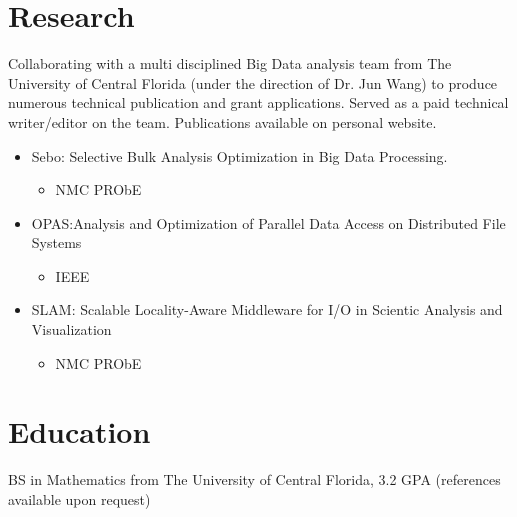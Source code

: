 \documentclass[font = 23,a4paper,sans]{moderncv}
\begin{document}
\section {Research} 
        Collaborating with a multi disciplined Big Data analysis team from The University of Central Florida (under the direction of Dr. Jun Wang) to produce 
            numerous technical publication and grant applications. Served as a paid technical writer/editor on the team. Publications available on personal website.
            \begin{itemize}
                \item Sebo: Selective Bulk Analysis Optimization in Big Data Processing. 
                    \begin{itemize}
                        \item NMC PRObE 
                    \end{itemize}
                \item OPAS:Analysis and Optimization of Parallel Data Access on Distributed File Systems
                    \begin{itemize}
                        \item IEEE
                    \end{itemize}
                \item SLAM: Scalable Locality-Aware Middleware for I/O in Scientic Analysis and Visualization
                    \begin{itemize}
                        \item NMC PRObE 
                    \end{itemize}
            \end{itemize}

\section{Education}
    BS in Mathematics from The University of Central Florida, 3.2 GPA (references available upon request) 
\end{document}
